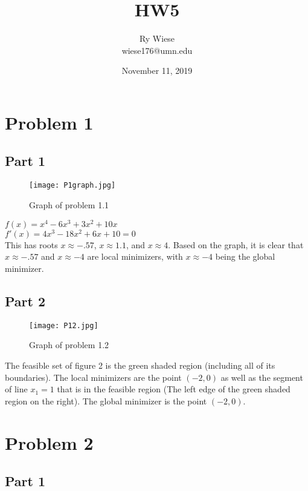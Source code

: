\documentclass{article}
\title{HW5}
\author{Ry Wiese\\wiese176@umn.edu}
\date{November 11, 2019}
\begin{document}
\maketitle

\section{Problem 1}

\subsection{Part 1}

\begin{figure}[h] %
  \centering
  \texttt{[image: P1graph.jpg]}
  \caption{Graph of problem 1.1}
  \label{fig:tabl}
\end{figure}

$f(x) = x^4 - 6x^3 + 3x^2 + 10x$\\
$f'(x) = 4x^3 - 18x^2 + 6x + 10 = 0$\\
This has roots $x \approx -.57$, $x \approx 1.1$, and $x \approx 4$. Based on the graph, it is clear that $x \approx -.57$ and $x \approx -4$ are local minimizers, with $x 
\approx -4$ being the global minimizer.

\subsection{Part 2}

\begin{figure}[h] %
  \centering
  \texttt{[image: P12.jpg]}
  \caption{Graph of problem 1.2}
  \label{fig:tabl}
\end{figure}

The feasible set of figure 2 is the green shaded region (including all of its boundaries). The local minimizers are the point $(-2, 0)$ as well as the segment of line $x_1 = 1$ that is in the feasible region (The left edge of the green shaded region on the right). The global minimizer is the point $(-2, 0)$. 

\section{Problem 2}

\subsection{Part 1}
\end{document}
